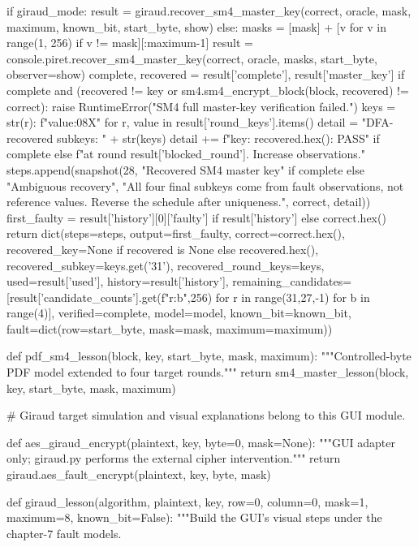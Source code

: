 \begin{lightcode}[numbers=left,firstnumber=1]
    if giraud_mode:
        result = giraud.recover_sm4_master_key(correct, oracle, mask, maximum, known_bit, start_byte, show)
    else:
        masks = [mask] + [v for v in range(1, 256) if v != mask][:maximum-1]
        result = console.piret.recover_sm4_master_key(correct, oracle, masks, start_byte, observer=show)
    complete, recovered = result['complete'], result['master_key']
    if complete and (recovered != key or sm4.sm4_encrypt_block(block, recovered) != correct):
        raise RuntimeError("SM4 full master-key verification failed.")
    keys = {str(r): f"{value:08X}" for r, value in result['round_keys'].items()}
    detail = "DFA-recovered subkeys: " + str(keys)
    detail += f"\nMaster key: {recovered.hex()}\nVerification: PASS" if complete else f"\nAmbiguous at round {result['blocked_round']}. Increase observations."
    steps.append(snapshot(28, "Recovered SM4 master key" if complete else "Ambiguous recovery", "All four final subkeys come from fault observations, not reference values. Reverse the schedule after uniqueness.", correct, detail))
    first_faulty = result['history'][0]['faulty'] if result['history'] else correct.hex()
    return dict(steps=steps, output=first_faulty, correct=correct.hex(), recovered_key=None if recovered is None else recovered.hex(), recovered_subkey=keys.get('31'), recovered_round_keys=keys, used=result['used'], history=result['history'], remaining_candidates=[result['candidate_counts'].get(f"{r}:{b}",256) for r in range(31,27,-1) for b in range(4)], verified=complete, model=model, known_bit=known_bit, fault=dict(row=start_byte, mask=mask, maximum=maximum))


def pdf_sm4_lesson(block, key, start_byte, mask, maximum):
    """Controlled-byte PDF model extended to four target rounds."""
    return sm4_master_lesson(block, key, start_byte, mask, maximum)


# Giraud target simulation and visual explanations belong to this GUI module.

def aes_giraud_encrypt(plaintext, key, byte=0, mask=None):
    """GUI adapter only; giraud.py performs the external cipher intervention."""
    return giraud.aes_fault_encrypt(plaintext, key, byte, mask)


def giraud_lesson(algorithm, plaintext, key, row=0, column=0, mask=1, maximum=8, known_bit=False):
    """Build the GUI's visual steps under the chapter-7 fault models.


\end{lightcode}
